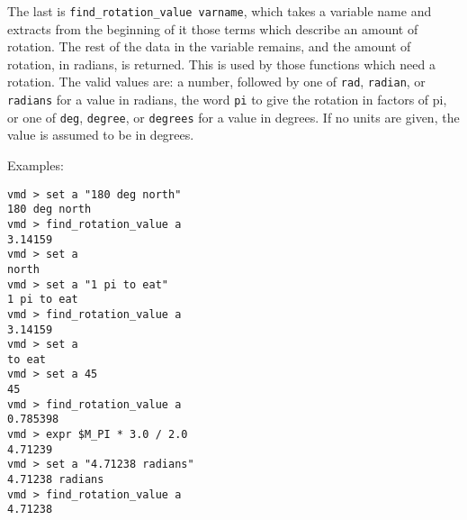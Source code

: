   The last is {\tt find\_rotation\_value varname}, which takes a
variable name and extracts from the beginning of it those terms which
describe an amount of rotation.  The rest of the data in the variable
remains, and the amount of rotation, in radians, is returned.  This is
used by those functions which need a rotation.  The valid values are:
a number, followed by one of {\tt rad}, {\tt radian}, or {\tt radians}
for a value in radians, the word {\tt pi} to give the rotation in
factors of pi, or one of {\tt deg}, {\tt degree}, or {\tt degrees} for
a value in degrees.  If no units are given, the value is assumed to be
in degrees.

Examples:
\begin{verbatim}
vmd > set a "180 deg north"
180 deg north
vmd > find_rotation_value a
3.14159
vmd > set a
north
vmd > set a "1 pi to eat"
1 pi to eat
vmd > find_rotation_value a
3.14159
vmd > set a
to eat
vmd > set a 45 
45
vmd > find_rotation_value a
0.785398
vmd > expr $M_PI * 3.0 / 2.0
4.71239
vmd > set a "4.71238 radians"
4.71238 radians
vmd > find_rotation_value a
4.71238
\end{verbatim}
